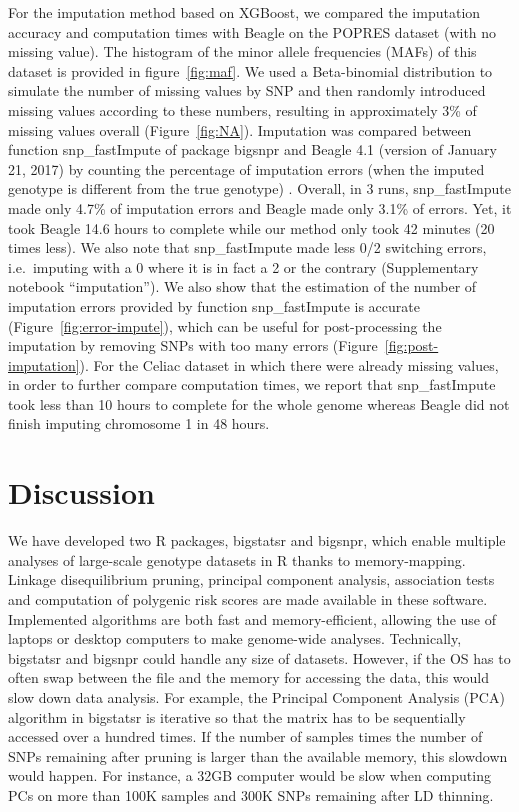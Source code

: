 \documentclass{bioinfo}
\begin{document}
For the imputation method based on XGBoost, we compared  the imputation accuracy and computation times with Beagle on the POPRES dataset (with no missing value). 
The histogram of the minor allele frequencies (MAFs) of this dataset is provided in figure~\ref{fig:maf}. 
We used a Beta-binomial distribution to simulate the number of missing values by SNP and then randomly introduced missing values according to these numbers, resulting in approximately 3\% of missing values overall (Figure~\ref{fig:NA}).
Imputation was compared between function snp\_fastImpute of package bigsnpr and Beagle 4.1 (version of January 21, 2017) 
{\color{red}
by counting the percentage of imputation errors (when the imputed genotype is different from the true genotype)
}.
Overall, in 3 runs, snp\_fastImpute made only 4.7\% of imputation errors and Beagle made only 3.1\% of errors. Yet, it took Beagle 14.6 hours to complete while our method only took 42 minutes (20 times less). 
{\color{red}
We also note that snp\_fastImpute made less 0/2 switching errors, i.e.\ imputing with a 0 where it is in fact a 2 or the contrary (Supplementary notebook ``imputation'').
We also show that the estimation of the number of imputation errors provided by function snp\_fastImpute is accurate (Figure~\ref{fig:error-impute}), which can be useful for post-processing the imputation by removing SNPs with too many errors (Figure~\ref{fig:post-imputation}).
}
For the Celiac dataset in which there were already missing values, in order to further compare computation times, we report that snp\_fastImpute took less than 10 hours to complete for the whole genome whereas Beagle did not finish imputing chromosome 1 in 48 hours. 


\section{Discussion}

We have developed two R packages, bigstatsr and bigsnpr, which enable multiple analyses of large-scale genotype datasets in R thanks to memory-mapping. Linkage disequilibrium pruning, principal component analysis, association tests and computation of polygenic risk scores are made available in these software. Implemented algorithms are both fast and memory-efficient, allowing the use of laptops or desktop computers to make genome-wide analyses.
Technically, bigstatsr and bigsnpr could handle any size of datasets. However, if the OS has to often swap between the file and the memory for accessing the data, this would slow down data analysis. For example, the Principal Component Analysis (PCA) algorithm in bigstatsr is iterative so that the matrix has to be sequentially accessed over a hundred times. If the number of samples times the number of SNPs remaining after pruning is larger than the available memory, this slowdown would happen. For instance, a 32GB computer would be slow when computing PCs on more than 100K samples and 300K SNPs remaining after LD thinning.
\end{document}

